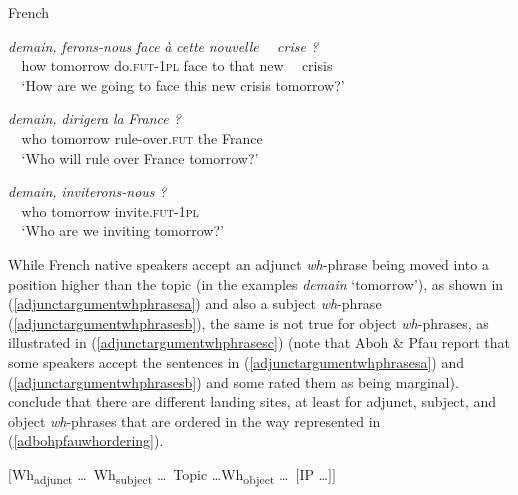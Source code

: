 \begin{exe}
\ex French \citep[101]{aboh2010sa}\label{adjunctargumentwhphrases}\begin{xlist}
\ex {} {\textit{demain,}} {\textit{ferons-nous}} {\textit{face}} {\textit{à}} {\textit{cette}} {\textit{nouvelle}} {\textcolor{white}{\cmark /?}\textit{crise ?}} \\
{\textcolor{white}{\cmark /?}how} {tomorrow} {do.\textsc{fut}-\textsc{1pl}} {face} {to} {that} {new} {\textcolor{white}{\cmark /?}crisis}\\
\trans \textcolor{white}{\cmark /?}`How are we going to face this new crisis tomorrow?' \label{adjunctargumentwhphrasesa}

\ex {} {\textit{demain,}} {\textit{dirigera}} {\textit{la}} {\textit{France ?}}  \\
{\textcolor{white}{\cmark /?}who} {tomorrow} {rule-over.\textsc{fut}} {the} {France}\\
\trans \textcolor{white}{\cmark /?}`Who will rule over France tomorrow?'\label{adjunctargumentwhphrasesb}

\ex {} {\textit{demain,}} {\textit{inviterons-nous ?}}   \\
{\textcolor{white}{\cmark /?}who} {tomorrow} {invite.\textsc{fut}-\textsc{1pl}} \\
\trans \textcolor{white}{\cmark /?}`Who are we inviting tomorrow?'\label{adjunctargumentwhphrasesc}

\end{xlist}
\end{exe}

\noindent While French native speakers accept an adjunct \textit{wh}-phrase being moved into a position higher than the topic (in the examples \textit{demain} `tomorrow'), as shown in (\ref{adjunctargumentwhphrasesa}) and also a subject \textit{wh}-phrase (\ref{adjunctargumentwhphrasesb}), the same is not true for object \textit{wh}-phrases, as illustrated in (\ref{adjunctargumentwhphrasesc}) (note that Aboh \& Pfau report that some speakers accept the sentences in (\ref{adjunctargumentwhphrasesa}) and (\ref{adjunctargumentwhphrasesb}) and some rated them as being marginal). \citet[102]{aboh2010sa} conclude that there are different landing sites, at least for adjunct, subject, and object \textit{wh}-phrases that are ordered in the way represented in (\ref{adbohpfauwhordering}).

\begin{exe}
\ex $[$Wh\textsubscript{adjunct} \dots\ Wh\textsubscript{subject} \dots\ Topic \dots Wh\textsubscript{object} \dots\  $[$IP \dots $]$$]$ \label{adbohpfauwhordering}
\end{exe}

